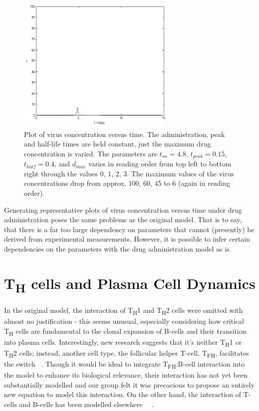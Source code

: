\documentclass[a4paper, 12pt]{report}
\begin{document}
\begin{figure}[h!]
\includegraphics[width=75mm]{drug_three.png}
\caption{Plot of virus concentration versus time. The administration, peak and half-life times are held constant, just the maximum drug concentration is varied. The parameters are $t_{on} = 4.8$, $t_{peak} = 0.15$, $t_{half} = 0.4$, and $d_{max}$ varies in reading order from top left to bottom right through the values 0, 1, 2, 3. The maximum values of the virus concentrations drop from approx. 100, 60, 45 to 6 (again in reading order).}
\label{fig:onsetTimes}
\end{figure}

Generating representative plots of virus concentration versus time under drug administration poses the same problems as the original model. That is to say, that there is a far too large dependency on parameters that cannot (presently) be derived from experimental measurements. However, it is possible to infer certain dependencies on the parameters with the drug administration model as is.

\newpage
\section{ T\textsubscript{H} cells and Plasma Cell Dynamics} %
In the original model, the interaction of T\textsubscript{H}1 and T\textsubscript{H}2 cells were omitted with almost no justification - this seems unusual, especially considering how critical T\textsubscript{H} cells are fundamental to the clonal expansion of B-cells and their transition into plasma cells. Interestingly, new research suggests that it's neither T\textsubscript{H}1 or T\textsubscript{H}2 cells; instead, another cell type, the follicular helper T-cell, T\textsubscript{FH}, facilitates the switch ~\cite{Swain}. Though it would be ideal to integrate T\textsubscript{FH}:B-cell interaction into the model to enhance its biological relevance, their interaction has not yet been substantially modelled and our group felt it was precocious to propose an entirely new equation to model this interaction. On the other hand, the interaction of T-cells and B-cells has been modelled elsewhere ~\cite{Carneiro1}~\cite{Carneiro2}.\\ 
\end{document}
